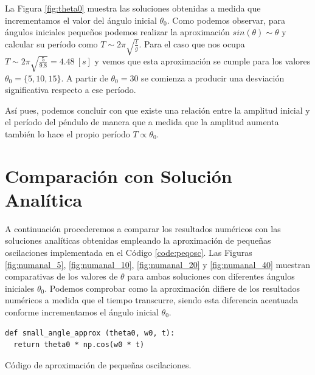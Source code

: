 \documentclass[journal]{IEEEtran}
\newenvironment{code}{\captionsetup{type=listing}}{\par\addvspace{\baselineskip}}
\begin{document}
La Figura \ref{fig:theta0} muestra las soluciones obtenidas a medida que incrementamos el valor del ángulo inicial $\theta_0$. Como podemos observar, para ángulos iniciales pequeños podemos realizar la aproximación $sin(\theta) \sim \theta$ y calcular su período como $T \sim 2\pi\sqrt{\frac{l}{g}}$. Para el caso que nos ocupa $T \sim 2\pi\sqrt{\frac{5}{9.8}} = 4.48~[s]$ y vemos que esta aproximación se cumple para los valores $\theta_0 = \{5, 10,
15\}$. A partir de $\theta_0 = 30$ se comienza a producir una desviación significativa respecto a ese período.

Así pues, podemos concluir con que existe una relación entre la amplitud inicial y el período del péndulo de manera que a medida que la amplitud aumenta también lo hace el propio período $T\propto \theta_0$.

\section{Comparación con Solución Analítica}

A continuación procederemos a comparar los resultados numéricos con las soluciones analíticas obtenidas empleando la aproximación de pequeñas oscilaciones implementada en el Código \ref{code:peqosc}. Las Figuras \ref{fig:numanal_5}, \ref{fig:numanal_10}, \ref{fig:numanal_20} y \ref{fig:numanal_40} muestran comparativas de los valores de $\theta$ para ambas soluciones con diferentes ángulos iniciales $\theta_0$. Podemos comprobar como la aproximación difiere de los resultados numéricos a medida que el tiempo transcurre, siendo esta diferencia acentuada conforme incrementamos el ángulo inicial $\theta_0$.

\medskip

\begin{code}
  \begin{verbatim}
def small_angle_approx (theta0, w0, t):
  return theta0 * np.cos(w0 * t)
  \end{verbatim}
  \caption{Código de aproximación de pequeñas oscilaciones.}
  \label{code:peqosc}
\end{code}
\end{document}
